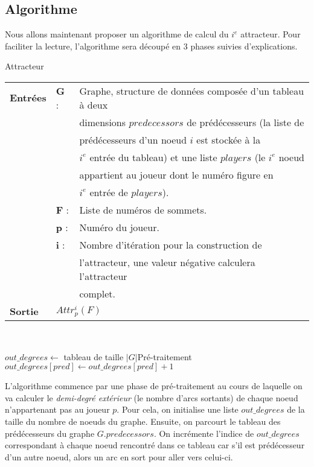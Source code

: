 \documentclass[12pt,a4paper,oneside,titlepage]{report}
\begin{document}
\subsection{Algorithme}
Nous allons maintenant proposer un algorithme de calcul du $i^e$ attracteur. Pour faciliter la lecture, l'algorithme sera découpé en 3 phases suivies d'explications.
\begin{algorithm}[H]
\caption{Attracteur}\label{attractor}
\hspace*{\algorithmicindent} 
\begin{tabular}{lll}
	\textbf{Entrées} & \textbf{G} : &Graphe, structure de données composée d'un tableau à deux\\
	&&dimensions $predecessors$ de prédécesseurs (la liste de \\
	&&prédécesseurs d'un noeud $i$ est stockée à la \\
	&&$i^e$ entrée du tableau) et une liste $players$ (le $i^e$ noeud\\
	&&appartient au joueur dont le numéro figure en \\
	&&$i^e$ entrée de $players$).\\
	&\textbf{F} : &Liste de numéros de sommets.\\
	&\textbf{p} : &Numéro du joueur.\\
	&\textbf{i} : &Nombre d'itération pour la construction de\\
	&&l'attracteur, une valeur négative calculera l'attracteur\\
	&&complet.\\
	\textbf{Sortie} &\multicolumn{2}{l}{$Attr_p^i(F)$}\\
\end{tabular}\\
\begin{algorithmic}[1]
	\State $out\_degrees \gets$ tableau de taille $|G|$\Comment Pré-traitement
				\State $out\_degrees[pred] \gets out\_degrees[pred]+1$
			\EndFor
		\EndIf
	\EndFor
{}
\end{algorithmic}
\end{algorithm}
L'algorithme commence par une phase de pré-traitement au cours de laquelle on va calculer le \emph{demi-degré extérieur} (le nombre d'arcs sortants) de chaque noeud n'appartenant pas au joueur $p$. Pour cela, on initialise une liste $out\_degrees$ de la taille du nombre de noeuds du graphe. Ensuite, on parcourt le tableau des prédécesseurs du graphe $G.predecessors$. On incrémente l'indice de $out\_degrees$ correspondant à chaque noeud rencontré dans ce tableau car s'il est prédécesseur d'un autre noeud, alors un arc en sort pour aller vers celui-ci.
\end{document}
